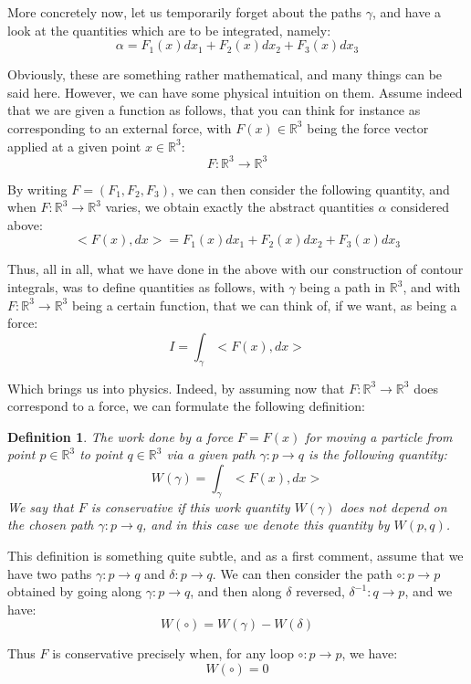 \documentclass[12pt]{amsbook}
\newtheorem{definition}[theorem]{Definition}
\begin{document}
More concretely now, let us temporarily forget about the paths $\gamma$, and have a look at the quantities which are to be integrated, namely:
$$\alpha=F_1(x)dx_1+F_2(x)dx_2+F_3(x)dx_3$$

Obviously, these are something rather mathematical, and many things can be said here. However, we can have some physical intuition on them. Assume indeed that we are given a function as follows, that you can think for instance as corresponding to an external force, with $F(x)\in\mathbb R^3$ being the force vector applied at a given point $x\in\mathbb R^3$:
$$F:\mathbb R^3\to\mathbb R^3$$

By writing $F=(F_1,F_2,F_3)$, we can then consider the following quantity, and when $F:\mathbb R^3\to\mathbb R^3$ varies, we obtain exactly the abstract quantities $\alpha$ considered above:
$$<F(x),dx>=F_1(x)dx_1+F_2(x)dx_2+F_3(x)dx_3$$

Thus, all in all, what we have done in the above with our construction of contour integrals, was to define quantities as follows, with $\gamma$ being a path in $\mathbb R^3$, and with $F:\mathbb R^3\to\mathbb R^3$ being a certain function, that we can think of, if we want, as being a force:
$$I=\int_\gamma<F(x),dx>$$

Which brings us into physics. Indeed, by assuming now that $F:\mathbb R^3\to\mathbb R^3$ does correspond to a force, we can formulate the following definition:


\begin{definition}
The work done by a force $F=F(x)$ for moving a particle from point $p\in\mathbb R^3$ to point $q\in\mathbb R^3$ via a given path $\gamma:p\to q$ is the following quantity:
$$W(\gamma)=\int_\gamma<F(x),dx>$$
We say that $F$ is conservative if this work quantity $W(\gamma)$ does not depend on the chosen path $\gamma:p\to q$, and in this case we denote this quantity by $W(p,q)$.
\end{definition}

This definition is something quite subtle, and as a first comment, assume that we have two paths $\gamma:p\to q$ and $\delta:p\to q$. We can then consider the path $\circ:p\to p$ obtained by going along $\gamma:p\to q$, and then along $\delta$ reversed, $\delta^{-1}:q\to p$, and we have:
$$W(\circ)=W(\gamma)-W(\delta)$$ 

Thus $F$ is conservative precisely when, for any loop $\circ:p\to p$, we have: 
$$W(\circ)=0$$
\end{document}

